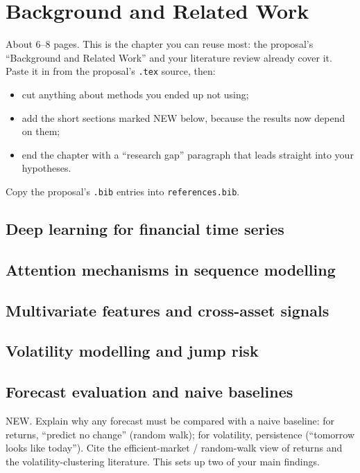 \chapter{Background and Related Work}\label{ch:background}

\begin{guide}
About 6--8 pages. This is the chapter you can reuse most: the proposal's ``Background and Related Work'' and your literature review already cover it. Paste it in from the proposal's \texttt{.tex} source, then:
\begin{itemize}
  \item cut anything about methods you ended up not using;
  \item add the short sections marked NEW below, because the results now depend on them;
  \item end the chapter with a ``research gap'' paragraph that leads straight into your hypotheses.
\end{itemize}
Copy the proposal's \texttt{.bib} entries into \texttt{references.bib}.
\end{guide}

\section{Deep learning for financial time series}

\section{Attention mechanisms in sequence modelling}

\section{Multivariate features and cross-asset signals}

\section{Volatility modelling and jump risk}

\section{Forecast evaluation and naive baselines}\label{sec:bg-baselines}
\begin{guide}
NEW. Explain why any forecast must be compared with a naive baseline: for returns, ``predict no change'' (random walk); for volatility, persistence (``tomorrow looks like today''). Cite the efficient-market / random-walk view of returns and the volatility-clustering literature. This sets up two of your main findings.
\end{guide}
\tbc{}


